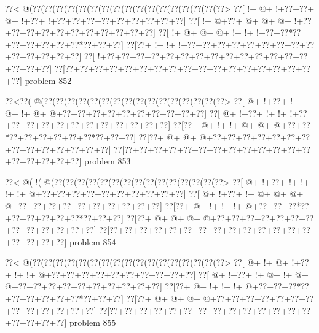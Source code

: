 \vbox{\vbox{\goo
\0??<\- @(\0??(\0??(\0??(\0??(\0??(\0??(\0??(\0??(\0??(\0??(\0??(\0??(\0??(\0??(\0??(\0??(\0??>
\0??[\- !+\- @+\- !+\0??+\0??+\- @+\- !+\0??+\- !+\0??+\0??+\0??+\0??+\0??+\0??+\0??+\0??+\0??]
\0??[\- !+\- @+\0??+\- @+\- @+\- @+\- !+\0??+\0??+\0??+\0??+\0??+\0??+\0??+\0??+\0??+\0??+\0??]
\0??[\- !+\- @+\- @+\- @+\- !+\- !+\- !+\0??+\0??*\0??+\0??+\0??+\0??+\0??+\0??*\0??+\0??+\0??]
\0??[\0??+\- !+\- !+\- !+\0??+\0??+\0??+\0??+\0??+\0??+\0??+\0??+\0??+\0??+\0??+\0??+\0??+\0??]
\0??[\- !+\0??+\0??+\0??+\0??+\0??+\0??+\0??+\0??+\0??+\0??+\0??+\0??+\0??+\0??+\0??+\0??+\0??]
\0??[\0??+\0??+\0??+\0??+\0??+\0??+\0??+\0??+\0??+\0??+\0??+\0??+\0??+\0??+\0??+\0??+\0??+\0??]
}
\hfil problem 852\hfil\break
}



\vbox{\vbox{\goo
\0??<\0??(\- @(\0??(\0??(\0??(\0??(\0??(\0??(\0??(\0??(\0??(\0??(\0??(\0??(\0??(\0??(\0??(\0??>
\0??[\- @+\- !+\0??+\- !+\- @+\- !+\- @+\- @+\0??+\0??+\0??+\0??+\0??+\0??+\0??+\0??+\0??+\0??]
\0??[\- @+\- !+\0??+\- !+\- !+\- !+\0??+\0??+\0??+\0??+\0??+\0??+\0??+\0??+\0??+\0??+\0??+\0??]
\0??[\0??+\- @+\- !+\- !+\- @+\- @+\- @+\0??+\0??*\0??+\0??+\0??+\0??+\0??+\0??*\0??+\0??+\0??]
\0??[\0??+\- @+\- @+\- @+\0??+\0??+\0??+\0??+\0??+\0??+\0??+\0??+\0??+\0??+\0??+\0??+\0??+\0??]
\0??[\0??+\0??+\0??+\0??+\0??+\0??+\0??+\0??+\0??+\0??+\0??+\0??+\0??+\0??+\0??+\0??+\0??+\0??]
}
\hfil problem 853\hfil\break
}



\vbox{\vbox{\goo
\0??<\- @(\- !(\- @(\0??(\0??(\0??(\0??(\0??(\0??(\0??(\0??(\0??(\0??(\0??(\0??(\0??(\0??(\0??>
\0??[\- @+\- !+\0??+\- !+\- !+\- !+\- !+\- @+\0??+\0??+\0??+\0??+\0??+\0??+\0??+\0??+\0??+\0??]
\0??[\- @+\- !+\0??+\- !+\- @+\- @+\- @+\- @+\0??+\0??+\0??+\0??+\0??+\0??+\0??+\0??+\0??+\0??]
\0??[\0??+\- @+\- !+\- !+\- !+\- @+\0??+\0??+\0??*\0??+\0??+\0??+\0??+\0??+\0??*\0??+\0??+\0??]
\0??[\0??+\- @+\- @+\- @+\- @+\0??+\0??+\0??+\0??+\0??+\0??+\0??+\0??+\0??+\0??+\0??+\0??+\0??]
\0??[\0??+\0??+\0??+\0??+\0??+\0??+\0??+\0??+\0??+\0??+\0??+\0??+\0??+\0??+\0??+\0??+\0??+\0??]
}
\hfil problem 854\hfil\break
}



\vbox{\vbox{\goo
\0??<\- @(\0??(\0??(\0??(\0??(\0??(\0??(\0??(\0??(\0??(\0??(\0??(\0??(\0??(\0??(\0??(\0??(\0??>
\0??[\- @+\- !+\- @+\- !+\0??+\- !+\- !+\- @+\0??+\0??+\0??+\0??+\0??+\0??+\0??+\0??+\0??+\0??]
\0??[\- @+\- !+\0??+\- !+\- @+\- !+\- @+\- @+\0??+\0??+\0??+\0??+\0??+\0??+\0??+\0??+\0??+\0??]
\0??[\0??+\- @+\- !+\- !+\- !+\- @+\0??+\0??+\0??*\0??+\0??+\0??+\0??+\0??+\0??*\0??+\0??+\0??]
\0??[\0??+\- @+\- @+\- @+\- @+\0??+\0??+\0??+\0??+\0??+\0??+\0??+\0??+\0??+\0??+\0??+\0??+\0??]
\0??[\0??+\0??+\0??+\0??+\0??+\0??+\0??+\0??+\0??+\0??+\0??+\0??+\0??+\0??+\0??+\0??+\0??+\0??]
}
\hfil problem 855\hfil\break
}



